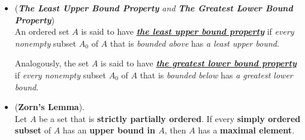 \documentclass[11pt]{article}
\begin{document}
\begin{itemize}
\item \begin{definition} (\textit{\textbf{The Least Upper Bound Property} and \textbf{The Greatest Lower Bound Property}})\\
An ordered set $A$ is said to have \underline{\emph{\textbf{the least upper bound property}}} if \emph{every} \emph{nonempty} subset $A_0$ of $A$ that is \emph{bounded above} has \emph{a least upper bound}. 

Analogously, the set $A$ is said to have \underline{\emph{\textbf{the greatest lower bound property}}} if \emph{every nonempty} subset $A_0$ of $A$ that is \emph{bounded below} has \emph{a greatest lower bound}.
\end{definition}

\item \begin{theorem} (\textbf{Zorn's Lemma}). \citep{munkres2000topology} \\
Let $A$ be a set that is \textbf{strictly partially ordered}. If every \textbf{simply ordered subset} of $A$ has an \textbf{upper bound in $A$}, then $A$ has a \textbf{maximal element}.
\end{theorem}
\end{itemize}
\end{document}

